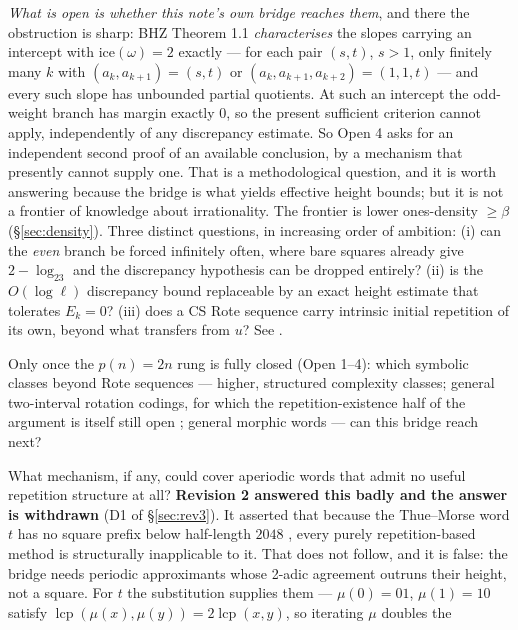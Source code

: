 \documentclass[11pt]{article}
\newcommand{\repo}[1]{\text{\texttt{#1}}}
\begin{document}
\begin{description}[leftmargin=3em,style=nextline]
\emph{What is open is whether this note's own bridge reaches them}, and there the obstruction is
sharp: BHZ Theorem 1.1 \emph{characterises} the slopes carrying an intercept with
$\text{ice}(\omega)=2$ exactly --- for each pair $(s,t)$, $s>1$, only finitely many $k$ with
$(a_k,a_{k+1})=(s,t)$ or $(a_k,a_{k+1},a_{k+2})=(1,1,t)$ --- and every such slope has unbounded
partial quotients. At such an intercept the odd-weight branch has margin exactly $0$, so the present
sufficient criterion cannot apply, independently of any discrepancy estimate. So Open 4 asks for an
independent second proof of an available conclusion, by a mechanism that presently cannot supply one.
That is a methodological question, and it is worth answering because the bridge is what yields
effective height bounds; but it is not a frontier of knowledge about irrationality. The frontier is
lower ones-density $\ge\beta$ (\S\ref{sec:density}). Three distinct questions, in increasing order of
ambition: (i) can the \emph{even} branch be forced infinitely
often, where bare squares already give $2-\log_23$ and the discrepancy hypothesis can be dropped
entirely? (ii) is the $O(\log\ell)$ discrepancy bound replaceable by an exact height estimate that
tolerates $E_k=0$? (iii) does a CS Rote sequence carry intrinsic initial repetition of its own,
beyond what transfers from $u$? See \repo{theorems/phase8/PHASE8\_NEXT\_TARGET.md}.
\item[Open 5 --- Higher complexity.] Only once the $p(n)=2n$ rung is fully closed (Open 1--4): which symbolic classes beyond Rote sequences --- higher, structured complexity classes; general two-interval rotation codings, for which the repetition-existence half of the argument is itself still open \cite{Phase2Rotation}; general morphic words --- can this bridge reach next?
\item[Open 6 --- The full Periodicity Conjecture.] What mechanism, if any, could cover aperiodic
words that admit no useful repetition structure at all? \textbf{Revision 2 answered this badly and
the answer is withdrawn} (D1 of \S\ref{sec:rev3}). It asserted that because the Thue--Morse word $t$
has no square prefix below half-length $2048$ \cite{Phase1Gap}, every purely repetition-based method
is structurally inapplicable to it. That does not follow, and it is false: the bridge needs periodic
approximants whose 2-adic agreement outruns their height, not a square. For $t$ the substitution
supplies them --- $\mu(0)=01$, $\mu(1)=10$ satisfy
$\operatorname{lcp}(\mu(x),\mu(y))=2\operatorname{lcp}(x,y)$, so iterating $\mu$ doubles the

\end{description}
\end{document}
